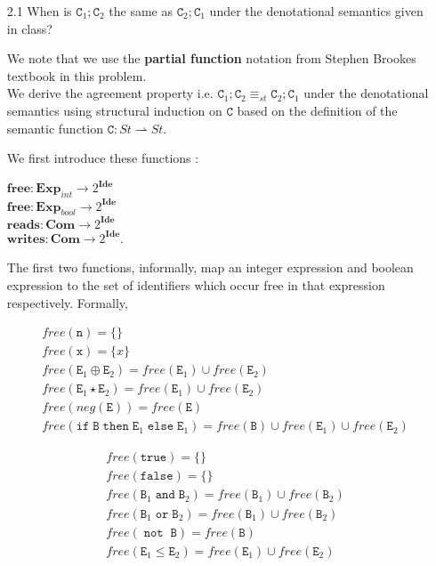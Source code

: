 \documentclass[a4paper,10pt]{article}
\newcommand{\E}{\mathtt{E}}
\newcommand{\B}{\mathtt{B}}
\newcommand{\C}{\mathtt{C}}
\newcommand{\true}{\mathtt{true}}
\newcommand{\false}{\mathtt{false}}
\newcommand{\andsym}{\mathtt{and}}
\newcommand{\orsym}{\mathtt{or}}
\newcommand{\notsym}{\mathop{\mathtt{not}}}
\newcommand{\ifsym}{\mathtt{if}}
\newcommand{\then}{\mathtt{then}}
\newcommand{\elsesym}{\mathtt{else}}
\newcommand{\question}[1]
{\color{DarkBlue}#1 \color{Black} \newline}
\begin{document}
\begin{enumerate}

\question{
\item[2.1] When is $\C_1 ; \C_2$ the same as $\C_2 ; \C_1$ under the denotational semantics given in class?
}

We note that we use the \textbf{partial function} notation from Stephen Brookes
textbook in this problem.\\

We derive the agreement property i.e. $\C_1 ; \C_2 \equiv_{st} \C_2 ; \C_1$
under the denotational semantics using structural induction on $\C$ based on the
definition of the semantic function $\C : St \rightharpoonup St$.

We first introduce these functions :

$\textbf{free} : \textbf{Exp}_{int} \rightarrow 2^{ \textbf{Ide} }$ \\
$\textbf{free} : \textbf{Exp}_{bool} \rightarrow 2^{ \textbf{Ide} }$ \\
$\textbf{reads} : \textbf{Com} \rightarrow 2^{ \textbf{Ide} }$ \\
$\textbf{writes} : \textbf{Com} \rightarrow 2^{ \textbf{Ide} }$. 

The first two functions, informally, map an integer expression and boolean
expression to the set of identifiers which occur free in that 
expression respectively. Formally,

\begin{align*}
& free(\mathtt{n}) = \{\} \\
& free(\mathtt{x}) = \{x\} \\
& free(\E_{1} \oplus \E_{2}) = free(\E_{1}) \cup free(\E_{2}) \\
& free(\E_{1} \star \E_{2}) = free(\E_{1}) \cup free(\E_{2}) \\
& free(neg(\E)) = free(\E) \\
& free(\ifsym \; \B \; \then \; \E_{1} \; \elsesym \; \E_{1}) = free(\B) \cup
free(\E_{1}) \cup free(\E_{2})
\end{align*}

\begin{align*}
& free(\true) = \{\} \\
& free(\false) = \{\} \\
& free(\B_{1} \; \andsym \; \B_{2}) = free(\B_{1}) \cup free(\B_{2}) \\
& free(\B_{1} \; \orsym \; \B_{2}) = free(\B_{1}) \cup free(\B_{2}) \\
& free(\notsym \; \B) = free(\B) \\
& free(\E_{1} \leq \E_{2}) = free(\E_{1}) \cup free(\E_{2})
\end{align*}


\end{enumerate}
\end{document}
